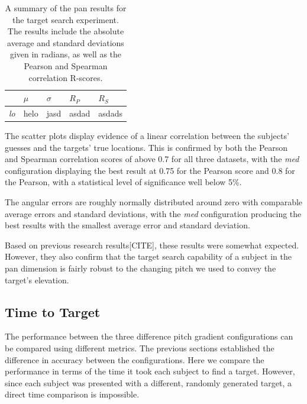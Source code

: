 \documentclass[format=sigconf, review=true, screen=true, anonymous=true]{acmart}
\begin{document}
\begin{table}
  \centering
  \caption{A summary of the pan results for the target search experiment. The results include the absolute average and standard deviations given in radians, as well as the Pearson and Spearman correlation R-scores.}
  \label{tab:pan-results}
  \begin{tabular}{|l|l|l|l|l|}
    \hline
    & $\mu$ & $\sigma$ & $R_{P}$ & $R_{S}$ \\\hline
    \emph{lo} &helo &jasd &asdad &asdads \\\hline
  \end{tabular}
\end{table}

The scatter plots display evidence of a linear correlation between the subjects' guesses and the targets' true locations. This is confirmed by both the Pearson and Spearman correlation scores of above 0.7 for all three datasets, with the \emph{med} configuration displaying the best result at 0.75 for the Pearson score and 0.8 for the Pearson, with a statistical level of significance well below 5\%. 

The angular errors are roughly normally distributed around zero with comparable average errors and standard deviations, with the \emph{med} configuration producing the best results with the smallest average error and standard deviation. 

Based on previous research results[CITE], these results were somewhat expected. However, they also confirm that the target search capability of a subject in the pan dimension is fairly robust to the changing pitch we used to convey the target's elevation. %

\subsection{Time to Target}

The performance between the three difference pitch gradient configurations can be compared using different metrics. The previous sections established the difference in accuracy between the configurations. Here we compare the performance in terms of the time it took each subject to find a target. However, since each subject was presented with a different, randomly generated target, a direct time comparison is impossible. 
\end{document}

